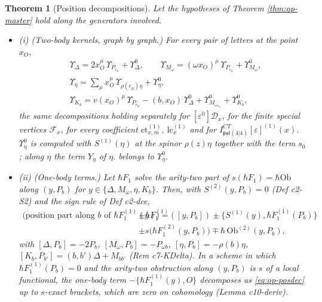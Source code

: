 \documentclass[11pt]{article}
\numberwithin{equation}{section}
\theoremstyle{plain}
\newtheorem{theorem}{Theorem}[section]
\theoremstyle{definition}
\newcommand{\psl}{\mathfrak{psl}(4|4)}
\newcommand{\lc}{\mathrm{lc}}
\newcommand{\ct}{\mathrm{ct}}
\begin{document}
\begin{theorem}[Position decompositions]
\label{thm:op-b}
Let the hypotheses of Theorem \ref{thm:op-master} hold along the generators involved.
\begin{itemize}
\item (i) (Two-body kernels, graph by graph.) For every pair of letters at the point $x_O$,
\begin{equation}
\begin{aligned}
&\Upsilon_\Delta=2x_O^\mu\,\Upsilon_{P_{e_\mu}}+\Upsilon^0_\Delta,\qquad \Upsilon_{M_\omega}=(\omega x_O)^\mu\,\Upsilon_{P_{e_\mu}}+\Upsilon^0_{M_\omega},\\
&\Upsilon_\eta=\sum_\mu x_O^\mu\,\Upsilon_{\rho(e_\mu)\eta}+\Upsilon^0_\eta,\\
&\Upsilon_{K_b}=v(x_O)^\mu\,\Upsilon_{P_{e_\mu}}-(b,x_O)\,\Upsilon^0_\Delta+\Upsilon^0_{M_{\omega_{x_O}}}+\Upsilon^0_{K_b},
\end{aligned}
\label{eq:op-posdec}
\end{equation}
the same decompositions holding separately for $[\varepsilon^0]\mathcal D_x$, for the finite special vertices $\mathcal F_x$, for every coefficient $\ct^{(1)}_{x,m}$, $\lc^{(1)}_x$ and for $I^{CT}_{\psl}[\varepsilon]^{(1)}(x)$. $\Upsilon^0_\eta$ is computed with $S^{(1)}(\eta)$ at the spinor $\rho(z)\eta$ together with the term $s_0$; along $\eta$ the term $Y_\eta$ of $\eta.$ belongs to $\Upsilon^0_\eta$.
\item (ii) (One-body terms.) Let $\hbar F_1$ solve the arity-two part of $s(\hbar F_1)=\hbar\mathrm{Ob}$ along $(y,P_b)$ for $y\in\{\Delta,M_\omega,\eta,K_b\}$. Then, with $S^{(2)}(y,P_b)=0$ (Def c2-S2) and the sign rule of Def c2-dce,
\begin{equation}
\begin{aligned}
\big(\text{position part along }b\text{ of }\hbar F_1^{(1)}(y)\big)=\ &\pm\hbar F_1^{(1)}([y,P_b])\pm\big\{S^{(1)}(y),\hbar F_1^{(1)}(P_b)\big\}\\
&\pm s\big(\hbar F_1^{(2)}(y,P_b)\big)\mp\hbar\,\mathrm{Ob}^{(2)}(y,P_b),
\end{aligned}
\label{eq:op-onebodypos}
\end{equation}
with $[\Delta,P_b]=-2P_b$, $[M_\omega,P_b]=-P_{\omega b}$, $[\eta,P_b]=-\rho(b)\eta$, $[K_b,P_{b'}]=(b,b')\Delta+M_{bb'}$ (Rem c7-KDelta). In a scheme in which $\hbar F_1^{(1)}(P_b)=0$ and the arity-two obstruction along $(y,P_b)$ is $s$ of a local functional, the one-body term $-\{\hbar F_1^{(1)}(y),O\}$ decomposes as \eqref{eq:op-posdec} up to $s$-exact brackets, which are zero on cohomology (Lemma c10-deriv).

\end{itemize}
\end{theorem}
\end{document}
